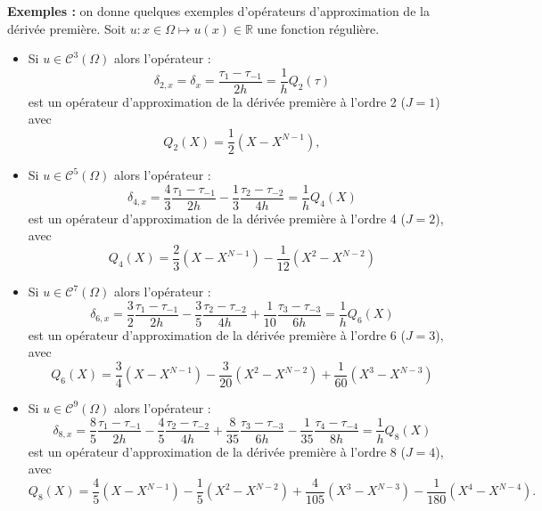 \textbf{Exemples :}
on donne quelques exemples d'opérateurs d'approximation de la dérivée première. Soit $u :  x \in \Omega \mapsto u(x) \in \mathbb{R}$ une fonction régulière. 
\begin{itemize}
\item Si $u \in \mathcal{C}^3 (\Omega)$ alors l'opérateur :
\begin{equation}
\delta_{2,x} = \delta_x = \dfrac{\tau_1 - \tau_{-1}}{2h} = \dfrac{1}{h}Q_2(\tau)
\label{eq:derprem_order2}
\end{equation}
est un opérateur d'approximation de la dérivée première à l'ordre 2 ($J=1$) avec 
\begin{equation}
Q_2(X) = \dfrac{1}{2}(X-X^{N-1}),
\end{equation}
\item Si $u \in \mathcal{C}^5 (\Omega)$ alors l'opérateur :
\begin{equation}
\delta_{4,x} = \dfrac{4}{3} \dfrac{\tau_1 - \tau_{-1}}{2h} - \dfrac{1}{3} \dfrac{\tau_2 - \tau_{-2}}{4h} = \dfrac{1}{h}Q_4(X)
\label{eq:derprem_order4}
\end{equation}
est un opérateur d'approximation de la dérivée première à l'ordre 4 ($J=2$), avec
\begin{equation}
Q_4(X) = \dfrac{2}{3} (X-X^{N-1}) - \dfrac{1}{12} (X^2-X^{N-2})
\end{equation}
\item Si $u \in \mathcal{C}^7 (\Omega)$ alors l'opérateur :
\begin{equation}
\delta_{6,x} = \dfrac{3}{2} \dfrac{\tau_1 - \tau_{-1}}{2h} - \dfrac{3}{5} \dfrac{\tau_2 - \tau_{-2}}{4h} + \dfrac{1}{10} \dfrac{\tau_3 - \tau_{-3}}{6h} = \dfrac{1}{h} Q_6(X)
\label{eq:derprem_order6}
\end{equation}
est un opérateur d'approximation de la dérivée première à l'ordre 6 ($J=3$), avec
\begin{equation}
Q_6(X) = \dfrac{3}{4} (X-X^{N-1}) - \dfrac{3}{20} (X^2-X^{N-2}) + \dfrac{1}{60} (X^3-X^{N-3})
\end{equation}
\item Si $u \in \mathcal{C}^9 (\Omega)$ alors l'opérateur :
\begin{equation}
\delta_{8,x} = \dfrac{8}{5} \dfrac{\tau_1 - \tau_{-1}}{2h} - \dfrac{4}{5} \dfrac{\tau_2 - \tau_{-2}}{4h} + \dfrac{8}{35} \dfrac{\tau_3 - \tau_{-3}}{6h} - \dfrac{1}{35} \dfrac{\tau_4 - \tau_{-4}}{8h} = \dfrac{1}{h}Q_8(X)
\label{eq:derprem_order8}
\end{equation}
est un opérateur d'approximation de la dérivée première à l'ordre 8 ($J=4$), avec
\begin{equation}
Q_8(X) = \dfrac{4}{5} (X-X^{N-1}) - \dfrac{1}{5} (X^2-X^{N-2}) + \dfrac{4}{105} (X^3-X^{N-3}) - \dfrac{1}{180} (X^4-X^{N-4}).
\end{equation}
\end{itemize}


